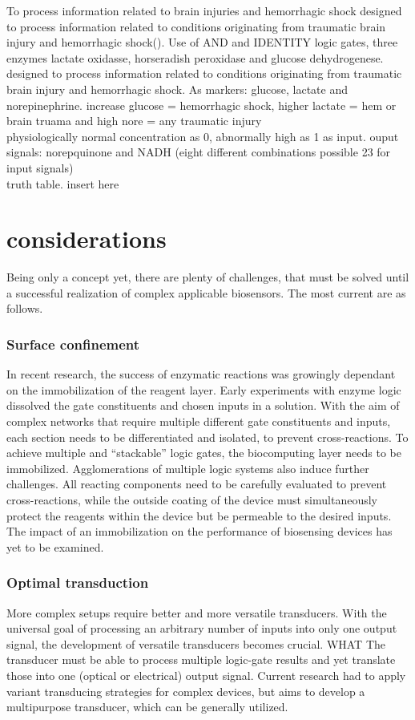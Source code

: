 \documentclass[runningheads]{llncs}
\begin{document}
	To process information related to brain injuries and hemorrhagic shock 
	designed to process information related to conditions originating from traumatic brain injury and hemorrhagic shock().
	Use of AND and IDENTITY logic gates, three enzymes lactate oxidasse, horseradish peroxidase and glucose dehydrogenese. designed to process information related to conditions originating from traumatic brain injury and hemorrhagic shock.
	As markers: glucose, lactate and norepinephrine.
	increase glucose = hemorrhagic shock, higher lactate = hem or brain truama and high nore = any traumatic injury \\
	physiologically normal concentration as 0, abnormally high as 1 as input.
	ouput signals: norepquinone and NADH (eight different combinations possible 23 for input signals)\\
	truth table. insert here 
	
	
	
	



\section{considerations} 
Being only a concept yet, there are plenty of challenges, that must be solved until a successful realization of complex applicable biosensors. The most current are as follows.
\subsubsection{Surface confinement}	In recent research, the success of enzymatic reactions was growingly dependant on the immobilization of the reagent layer. Early experiments with enzyme logic dissolved the gate constituents and chosen inputs in a solution. With the aim of complex networks that require multiple different gate constituents and inputs, each section needs to be differentiated and isolated, to prevent cross-reactions. To achieve multiple and “stackable” logic gates, the biocomputing layer needs to be immobilized. Agglomerations of multiple logic systems also induce further challenges. All reacting components need to be carefully evaluated to prevent cross-reactions, while the outside coating of the device must simultaneously protect the reagents within the device but be permeable to the desired inputs. The impact of an immobilization on the performance of biosensing devices has yet to be examined.\\

\subsubsection{Optimal transduction}	More complex setups require better and more versatile transducers. With the universal goal of processing an arbitrary number of inputs into only one output signal, the development of versatile transducers becomes crucial. WHAT The transducer must be able to process multiple logic-gate results and yet translate those into one (optical or electrical) output signal. Current research had to apply variant transducing strategies for complex devices, but aims to develop a multipurpose transducer, which can be generally utilized.\\
\end{document}
